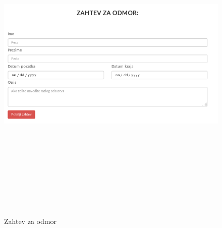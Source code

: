 \documentclass[10 pt]{article}
\begin{document}
		
		\begin{figure}[H]
			\centering
			\includegraphics[width=15cm,height=15cm,keepaspectratio]{GUI/formularZahtevZaOdmor.png}\\
			\caption{Zahtev za odmor}
			\label{fig:Odmor}
		\end{figure}
	
	
	
\end{document}
